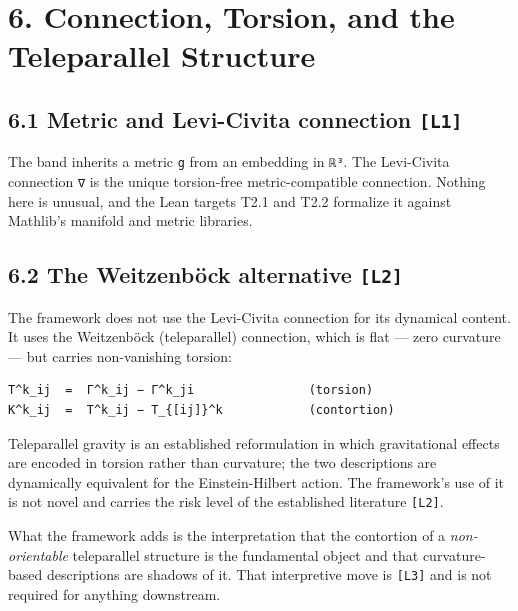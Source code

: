 \documentclass[
  11pt]{report}
\begin{document}
\hypertarget{connection-torsion-and-the-teleparallel-structure}{%
\chapter{6. Connection, Torsion, and the Teleparallel
Structure}\label{connection-torsion-and-the-teleparallel-structure}}

\hypertarget{metric-and-levi-civita-connection-l1}{%
\section{\texorpdfstring{6.1 Metric and Levi-Civita connection
\texttt{{[}L1{]}}}{6.1 Metric and Levi-Civita connection {[}L1{]}}}\label{metric-and-levi-civita-connection-l1}}

The band inherits a metric \texttt{g} from an embedding in \texttt{ℝ³}.
The Levi-Civita connection \texttt{∇} is the unique torsion-free
metric-compatible connection. Nothing here is unusual, and the Lean
targets T2.1 and T2.2 formalize it against Mathlib's manifold and metric
libraries.

\hypertarget{the-weitzenbuxf6ck-alternative-l2}{%
\section{\texorpdfstring{6.2 The Weitzenböck alternative
\texttt{{[}L2{]}}}{6.2 The Weitzenböck alternative {[}L2{]}}}\label{the-weitzenbuxf6ck-alternative-l2}}

The framework does not use the Levi-Civita connection for its dynamical
content. It uses the Weitzenböck (teleparallel) connection, which is
flat --- zero curvature --- but carries non-vanishing torsion:

\begin{verbatim}
T^k_ij  =  Γ^k_ij − Γ^k_ji                (torsion)
K^k_ij  =  T^k_ij − T_{[ij]}^k            (contortion)
\end{verbatim}

Teleparallel gravity is an established reformulation in which
gravitational effects are encoded in torsion rather than curvature; the
two descriptions are dynamically equivalent for the Einstein-Hilbert
action. The framework's use of it is not novel and carries the risk
level of the established literature \texttt{{[}L2{]}}.

What the framework adds is the interpretation that the contortion of a
\emph{non-orientable} teleparallel structure is the fundamental object
and that curvature-based descriptions are shadows of it. That
interpretive move is \texttt{{[}L3{]}} and is not required for anything
downstream.
\end{document}
